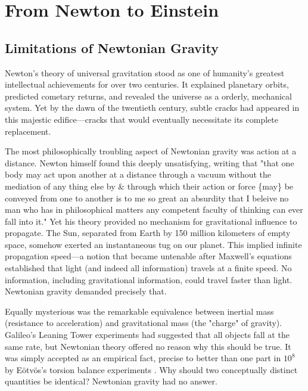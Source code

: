 \documentclass[12pt, a4paper]{article}
\begin{document}
	\section{From Newton to Einstein}
	
	
	\subsection{Limitations of Newtonian Gravity}
	
	Newton's theory of universal gravitation stood as one of humanity's greatest intellectual achievements for over two centuries. It explained planetary orbits, predicted cometary returns, and revealed the universe as a orderly, mechanical system. Yet by the dawn of the twentieth century, subtle cracks had appeared in this majestic edifice—cracks that would eventually necessitate its complete replacement.
	
	The most philosophically troubling aspect of Newtonian gravity was action at a distance. Newton himself found this deeply unsatisfying, writing that "that one body may act upon another at a distance through a vacuum without the mediation of any thing else by \& through which their action or force \{may\} be conveyed from one to another is to me so great an absurdity that I beleive no man who has in philosophical matters any competent faculty of thinking can ever fall into it." \citep{OriginalLetterIsaac} Yet his theory provided no mechanism for gravitational influence to propagate. The Sun, separated from Earth by 150 million kilometers of empty space, somehow exerted an instantaneous tug on our planet. This implied infinite propagation speed---a notion that became untenable after Maxwell's equations established that light (and indeed all information) travels at a finite speed. No information, including gravitational information, could travel faster than light. Newtonian gravity demanded precisely that.
	
	Equally mysterious was the remarkable equivalence between inertial mass (resistance to acceleration) and gravitational mass (the "charge" of gravity). Galileo's Leaning Tower experiments had suggested that all objects fall at the same rate, but Newtonian theory offered no reason why this should be true. It was simply accepted as an empirical fact, precise to better than one part in \(10^8\) by Eötvös's torsion balance experiments \citep{lakyTestMeasurementsEotvos2009}. Why should two conceptually distinct quantities be identical? Newtonian gravity had no answer.
	
\end{document}
